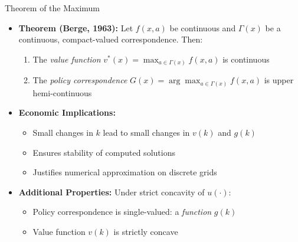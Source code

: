 \documentclass[10pt,english,aspectratio=169]{beamer}
\begin{document}
\begin{frame}{Theorem of the Maximum}
\begin{itemize}
\item \textbf{Theorem (Berge, 1963):} Let $f(x, a)$ be continuous and $\Gamma(x)$ be a continuous, compact-valued correspondence. Then:
\begin{enumerate}
    \item The \emph{value function} $v^*(x) = \max_{a \in \Gamma(x)} f(x,a)$ is continuous
    \item The \emph{policy correspondence} $G(x) = \arg\max_{a \in \Gamma(x)} f(x,a)$ is upper hemi-continuous
\end{enumerate}

\medskip
\item \textbf{Economic Implications:}
\begin{itemize}
    \item Small changes in $k$ lead to small changes in $v(k)$ and $g(k)$
    \item Ensures stability of computed solutions
    \item Justifies numerical approximation on discrete grids
\end{itemize}

\medskip
\item \textbf{Additional Properties:} Under strict concavity of $u(\cdot)$:
\begin{itemize}
    \item Policy correspondence is single-valued: a \emph{function} $g(k)$
    \item Value function $v(k)$ is strictly concave
\end{itemize}
\end{itemize}
\end{frame}
\end{document}
